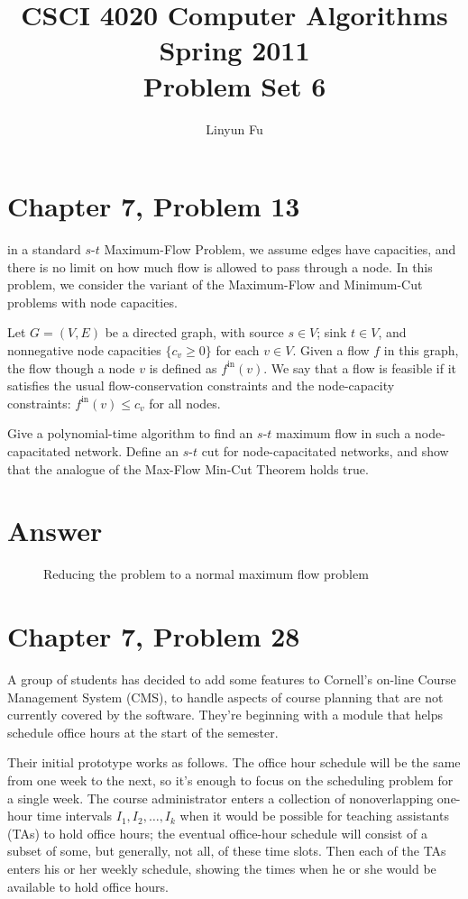 \documentclass[12pt,letterpaper]{article}
\author{Linyun Fu}
\title{CSCI 4020 Computer Algorithms Spring 2011\\
Problem Set 6}
\begin{document}
\maketitle
\section*{Chapter 7, Problem 13}
in a standard $s$-$t$ Maximum-Flow Problem, we assume edges have capacities,
and there is no limit on how much flow is allowed to pass through a node. In this problem, we consider the variant of the Maximum-Flow and
Minimum-Cut problems with node capacities.

Let $G = (V, E)$ be a directed graph, with source $s \in V$; sink $t \in V$, and
nonnegative node capacities $\{c_v \ge 0\}$ for each $v \in V$. Given a flow $f$ in this
graph, the flow though a node $v$ is defined as $f^{\textrm{in}}(v)$. We say that a flow
is feasible if it satisfies the usual flow-conservation constraints and the
node-capacity constraints: $f^{\textrm{in}}(v)\le c_v$ for all nodes.

Give a polynomial-time algorithm to find an $s$-$t$ maximum flow in
such a node-capacitated network. Define an $s$-$t$ cut for node-capacitated
networks, and show that the analogue of the Max-Flow Min-Cut Theorem
holds true.

\section*{Answer}
\begin{figure}
\begin{center}
\caption{Reducing the problem to a normal maximum flow problem}
\end{center}
\end{figure}

\section*{Chapter 7, Problem 28}
A group of students has decided to add some features to Cornell's on-line
Course Management System (CMS), to handle aspects of course planning
that are not currently covered by the software. They're beginning with a
module that helps schedule office hours at the start of the semester.

Their initial prototype works as follows. The office hour schedule will
be the same from one week to the next, so it's enough to focus on the
scheduling problem for a single week. The course administrator enters
a collection of nonoverlapping one-hour time intervals $I_1, I_2, \dots, I_k$ when
it would be possible for teaching assistants (TAs) to hold office hours;
the eventual office-hour schedule will consist of a subset of some, but
generally, not all, of these time slots. Then each of the TAs enters his or
her weekly schedule, showing the times when he or she would be available
to hold office hours.
\end{document}

